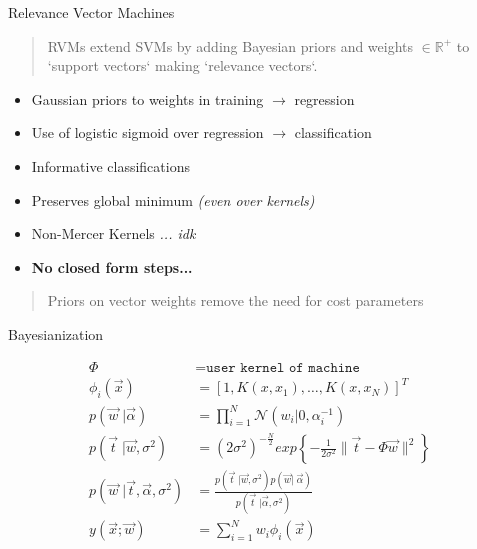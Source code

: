 \documentclass[10pt]{beamer}
\begin{document}
\begin{frame}{Relevance Vector Machines}

  \begin{quote}
    RVMs extend SVMs by adding Bayesian priors and weights \(\in \mathbb{R}^+\) to
    `support vectors` making `relevance vectors`.
  \end{quote}

  \begin{itemize}
  \item Gaussian priors to weights in training \;$\rightarrow$ regression
  \item Use of logistic sigmoid over regression $\rightarrow$ classification
  \item Informative classifications
  \item Preserves global minimum {\em (even over kernels)}
  \item Non-Mercer Kernels {\em ... idk}
  \item {\bf No closed form steps...}
  \end{itemize}

  \begin{quote}
    Priors on vector weights remove the need for cost parameters
  \end{quote}
\end{frame}

\begin{frame}{Bayesianization}

  \begin{align*}
    \Phi &= \texttt{user kernel of machine} \\
    \phi_i(\vec{x}) &= \left[1, K(x, x_1), \ldots, K(x, x_N)\right]^T \\
    p(\vec{w}\;| \vec{\alpha}) &= \prod_{i=1}^N \mathcal{N}(w_i| 0, \alpha_i^{-1}) \\
    p(\vec{t}\;|\vec{w}, \sigma^2) &= (2\sigma^2)^{-\frac{N}{2}} exp\left\{- \frac{1}{2\sigma^2}\|\vec{t} - \Phi\vec{w}\|^2 \right\}\\
    p(\vec{w}\;|\vec{t}, \vec{\alpha}, \sigma^2) &= \frac{p(\vec{t}\;|\vec{w}, \sigma^2)p(\vec{w}|\;\vec{\alpha})}{p(\vec{t}\;|\vec{\alpha}, \sigma^2)} \\
    y(\vec{x}; \vec{w}) &= \sum_{i=1}^N w_i \phi_i(\vec{x}) \\
  \end{align*}

\end{frame}
\end{document}
